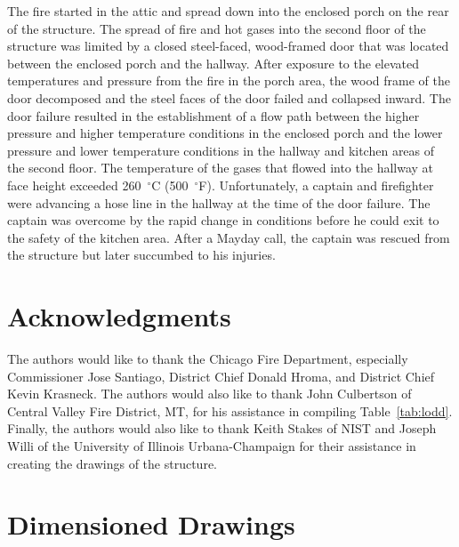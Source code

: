 \documentclass[12pt,oneside]{book}
\begin{document}
The fire started in the attic and spread down into the enclosed porch on the rear of the structure. The spread of fire and hot gases into the second floor of the structure was limited by a closed steel-faced, wood-framed door that was located between the enclosed porch and the hallway. After exposure to the elevated temperatures and pressure from the fire in the porch area, the wood frame of the door decomposed and the steel faces of the door failed and collapsed inward. The door failure resulted in the establishment of a flow path between the higher pressure and higher temperature conditions in the enclosed porch and the lower pressure and lower temperature conditions in the hallway and kitchen areas of the second floor. The temperature of the gases that flowed into the hallway at face height exceeded 260~$^{\circ}$C (500~$^{\circ}$F). Unfortunately, a captain and firefighter were advancing a hose line in the hallway at the time of the door failure. The captain was overcome by the rapid change in conditions before he could exit to the safety of the kitchen area. After a Mayday call, the captain was rescued from the structure but later succumbed to his injuries.


\chapter*{Acknowledgments}
The authors would like to thank the Chicago Fire Department, especially Commissioner Jose Santiago, District Chief Donald Hroma, and District Chief Kevin Krasneck. The authors would also like to thank John Culbertson of Central Valley Fire District, MT, for his assistance in compiling Table~\ref{tab:lodd}. Finally, the authors would also like to thank Keith Stakes of NIST and Joseph Willi of the University of Illinois Urbana-Champaign for their assistance in creating the drawings of the structure.




\appendix

\chapter{Dimensioned Drawings}
\end{document}
